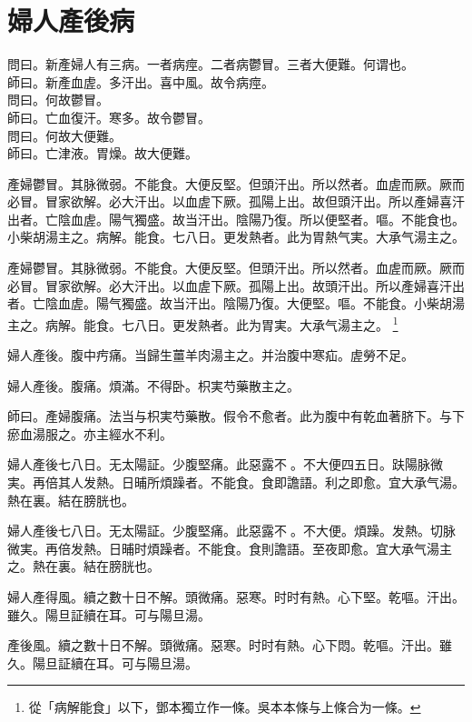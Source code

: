 \chapter{婦人產後病}

問曰。新產婦人有三病。一者病痙。二者病鬱冒。三者大便難。何谓也。\\
師曰。新產血虗。多汗出。喜中風。故令病痙。\\
{\khaaitp 問曰。何故鬱冒。}\\
{\khaaitp 師曰。}亡血復汗。寒多。故令鬱冒。\\
{\khaaitp 問曰。何故大便難。}\\
{\khaaitp 師曰。}亡津液。胃燥。故大便難。

產婦鬱{\khaaitp 冒}。其脉微弱。不能食。大便反堅。但頭汗出。所以然者。血虗而厥。厥而必冒。冒家欲解。必大汗出。以血虗下厥。孤陽上出。故但頭汗出。所以產婦喜汗出者。亡陰血虗。陽气獨盛。故当汗出。陰陽乃復。所以便堅者。嘔。不能食也。小柴胡湯主之。病解。能食。七八日。更发熱者。此为胃熱气実。大承气湯主之。{\wuben}

產婦鬱冒。其脉微弱。不能食。大便反堅。但頭汗出。所以然者。血虗而厥。厥而必冒。冒家欲解。必大汗出。以血虗下厥。孤陽上出。故頭汗出。所以產婦喜汗出者。亡陰血虗。陽气獨盛。故当汗出。陰陽乃復。大便堅。嘔。不能食。小柴胡湯主之。病解。能食。七八日。更发熱者。此为胃実。大承气湯主之。{\dengben}
	\footnote{從「病解能食」以下，鄧本獨立作一條。吳本本條与上條合为一條。}

{\khaaitp 婦人}產後。腹中㽲痛。当歸生薑羊肉湯主之。并治腹中寒疝。虗勞不足。

{\khaaitp 婦人}產後。腹痛。煩滿。不得卧。枳実芍藥散主之。

師曰。產婦腹痛。法当与枳実芍藥散。假令不愈者。此为腹中有乾血著脐下。与下瘀血湯服之。{\khaaitp 亦}主經水不利。

婦人產後七八日。无太陽証。少腹堅痛。此惡露不{\sungtpii 𥁞}。不大便四五日。趺陽脉微実。再倍其人发熱。日晡所煩躁者。不{\khaaitp 能}食。食即譫語。利之即愈。宜大承气湯。熱在裏。結在膀胱也。{\wuben}

{\khaaitp 婦人}產後七八日。无太陽証。少腹堅痛。此惡露不{\sungtpii 𥁞}。不大便。煩躁。发熱。切脉微実。再倍发熱。日晡时煩躁者。不{\khaaitp 能}食。食則譫語。至夜即愈。宜大承气湯主之。熱在裏。結在膀胱也。{\dengben}

婦人產得風。續之數十日不解。頭微痛。惡寒。时时有熱。心下堅。乾嘔。汗出。雖久。陽旦証續在耳。可与陽旦湯。{\wuben}

產後風。續之數十日不解。頭微痛。惡寒。时时有熱。心下悶。乾嘔。汗出。雖久。陽旦証續在耳。可与陽旦湯。{\dengben}

